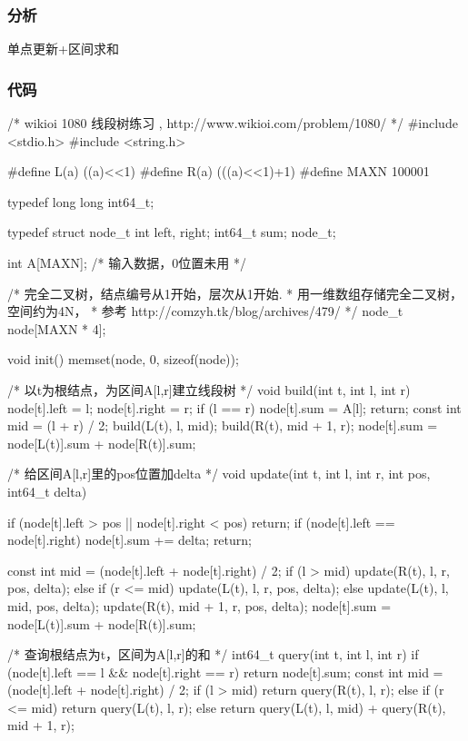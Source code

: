 \subsubsection{分析}
单点更新+区间求和

\subsubsection{代码}
\begin{Codex}[label=interval_tree1.c]
/* wikioi 1080 线段树练习 , http://www.wikioi.com/problem/1080/ */
#include <stdio.h>
#include <string.h>

#define L(a) ((a)<<1)
#define R(a) (((a)<<1)+1)
#define MAXN 100001

typedef long long int64_t;

typedef struct node_t {
    int left, right;
    int64_t sum;
} node_t;

int A[MAXN]; /* 输入数据，0位置未用 */

/* 完全二叉树，结点编号从1开始，层次从1开始.
 * 用一维数组存储完全二叉树，空间约为4N，
 * 参考 http://comzyh.tk/blog/archives/479/
 */
node_t node[MAXN * 4];

void init() {
    memset(node, 0, sizeof(node));
}

/* 以t为根结点，为区间A[l,r]建立线段树 */
void build(int t, int l, int r) {
    node[t].left = l;
    node[t].right = r;
    if (l == r) {
        node[t].sum = A[l];
        return;
    }
    const int mid = (l + r) / 2;
    build(L(t), l, mid);
    build(R(t), mid + 1, r);
    node[t].sum = node[L(t)].sum + node[R(t)].sum;
}

/* 给区间A[l,r]里的pos位置加delta */
void update(int t, int l, int r, int pos, int64_t delta) {
    if (node[t].left > pos || node[t].right < pos) return;
    if (node[t].left == node[t].right) {
        node[t].sum += delta;
        return;
    }

    const int mid = (node[t].left + node[t].right) / 2;
    if (l > mid) update(R(t), l, r, pos, delta);
    else if (r <= mid) update(L(t), l, r, pos, delta);
    else {
        update(L(t), l, mid, pos, delta);
        update(R(t), mid + 1, r, pos, delta);
    }
    node[t].sum = node[L(t)].sum + node[R(t)].sum;
}

/* 查询根结点为t，区间为A[l,r]的和 */
int64_t query(int t, int l, int r) {
    if (node[t].left == l && node[t].right == r)
        return node[t].sum;
    const int mid = (node[t].left + node[t].right) / 2;
    if (l > mid) return query(R(t), l, r);
    else if (r <= mid) return query(L(t), l, r);
    else return query(L(t), l, mid) + query(R(t), mid + 1, r);
}


\end{Codex}
